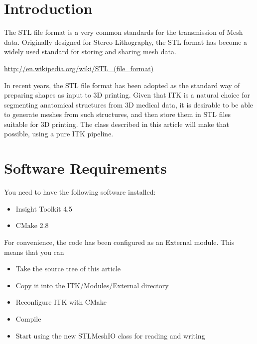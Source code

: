 \documentclass{InsightArticle}
\newcommand{\IJhandlerIDnumber}{3452}
\begin{document}
\IJhandlenote{\IJhandlerIDnumber}

\tableofcontents

\section{Introduction}

The STL file format is a very common standards for the transmission of Mesh
data.  Originally designed for Stereo Lithography, the STL format has become a
widely used standard for storing and sharing mesh data.

\begin{center}
\url{http://en.wikipedia.org/wiki/STL_(file_format)}
\end{center}

In recent years, the STL file format has been adopted as the standard way of
preparing shapes as input to 3D printing. Given that ITK is a natural choice
for segmenting anatomical structures from 3D medical data, it is desirable to
be able to generate meshes from such structures, and then store them in STL
files suitable for 3D printing. The class described in this article will make
that possible, using a pure ITK pipeline.


\section{Software Requirements}

You need to have the following software installed:

\begin{itemize}
  \item  Insight Toolkit 4.5
  \item  CMake 2.8
\end{itemize}

For convenience, the code has been configured as an External module. This means
that you can

\begin{itemize}
\item Take the source tree of this article
\item Copy it into the ITK/Modules/External directory
\item Reconfigure ITK with CMake
\item Compile
\item Start using the new STLMeshIO class for reading and writing
\end{itemize}
\end{document}
